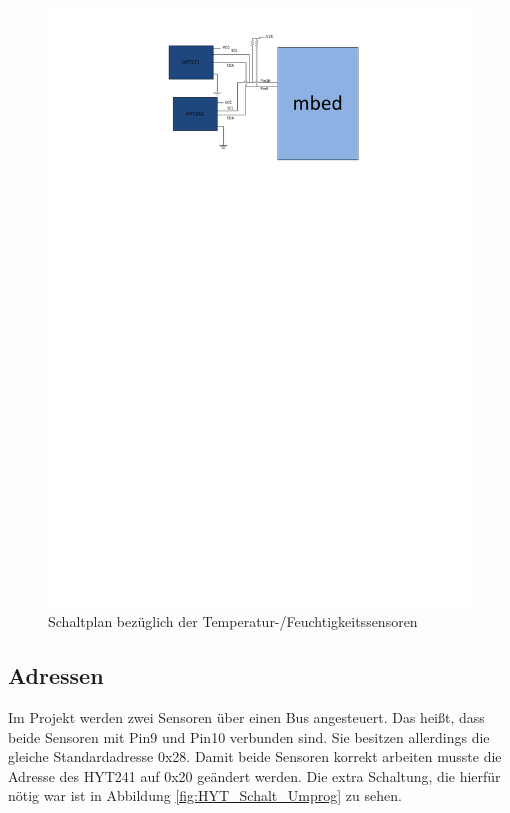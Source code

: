 			\begin{figure}[H]
				\centering
				\includegraphics[width=\textwidth]{Schaltplaene/HYT_I2C}
				\caption{Schaltplan bezüglich der Temperatur-/Feuchtigkeitssensoren}
				\label{fig:HYT_Schalt}
			\end{figure}

		\subsection{Adressen}
			Im Projekt werden zwei Sensoren über einen Bus angesteuert. Das heißt, dass beide Sensoren mit Pin9 und Pin10 verbunden sind. Sie besitzen allerdings die gleiche Standardadresse 0x28. Damit beide Sensoren korrekt arbeiten musste die Adresse des HYT241 auf 0x20 geändert werden. Die extra Schaltung, die hierfür nötig war ist in Abbildung \ref{fig:HYT_Schalt_Umprog} zu sehen.
			
